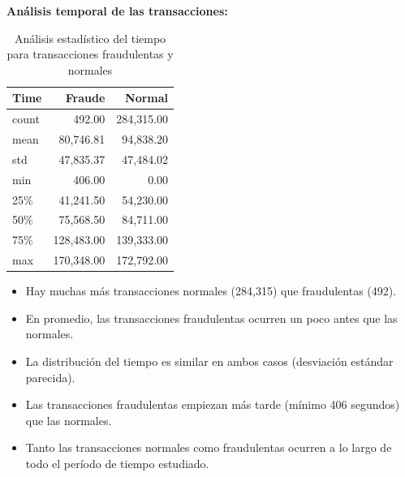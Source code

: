 \documentclass[9pt,a4paper,twoside]{rho-class/rho}
\begin{document}
        \textbf{Análisis temporal de las transacciones:}
        \begin{table}[h]
            \centering
            \begin{tabular}{lrr}
            \hline
            \textbf{Time} & \textbf{Fraude} & \textbf{Normal} \\
            \hline
            count & 492.00 & 284,315.00 \\
            mean & 80,746.81 & 94,838.20 \\
            std & 47,835.37 & 47,484.02 \\
            min & 406.00 & 0.00 \\
            25\% & 41,241.50 & 54,230.00 \\
            50\% & 75,568.50 & 84,711.00 \\
            75\% & 128,483.00 & 139,333.00 \\
            max & 170,348.00 & 172,792.00 \\
            \hline
            \end{tabular}
            \caption{Análisis estadístico del tiempo para transacciones fraudulentas y normales}
        \end{table}
        \begin{itemize}
            \item Hay muchas más transacciones normales (284,315) que fraudulentas (492).
            \item En promedio, las transacciones fraudulentas ocurren un poco antes que las normales.
            \item La distribución del tiempo es similar en ambos casos (desviación estándar parecida).
            \item Las transacciones fraudulentas empiezan más tarde (mínimo 406 segundos) que las normales.
            \item Tanto las transacciones normales como fraudulentas ocurren a lo largo de todo el período de tiempo estudiado.
        \end{itemize}
\end{document}
